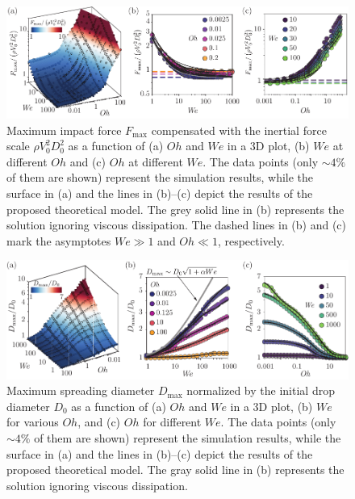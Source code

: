 \documentclass[preprint,amssymb,superscriptaddress,aps,prl,floatfix]{revtex4-1}
\begin{document}
\begin{figure}
\centering
\includegraphics[width=\linewidth]{Figure2_v4-eps-converted-to.pdf}
\caption{Maximum impact force $F_{\text{max}}$ compensated with the inertial force scale $\rho V_0^2D_0^2$ as a function of (a) $Oh$ and $We$ in a 3D plot, (b) $We$ at different $Oh$ and (c) $Oh$ at different $We$.  The data points (only $\sim 4\%$ of them are shown) represent the simulation results, while the surface in (a) and the lines in (b)--(c) depict the results of the proposed theoretical model. The grey solid line in (b) represents the solution ignoring viscous dissipation. The dashed lines in (b) and (c) mark the asymptotes $We \gg 1$ and $Oh \ll 1$, respectively.}
\label{fig:2}
\end{figure}


\begin{figure}
	\centering
	\includegraphics[width=\linewidth]{Figure3_v6-eps-converted-to.pdf}
	\caption{
 Maximum spreading diameter $D_{\text{max}}$ normalized by the initial drop diameter $D_0$ as a function of (a) $Oh$ and $We$ in a 3D plot, (b) $We$ for various $Oh$, and (c) $Oh$ for different $We$. The data points (only $\sim 4\%$ of them are shown)
 represent the simulation results, while the surface in (a) and the lines in (b)--(c) depict the results of the proposed theoretical model. The gray solid line in (b) represents the solution ignoring viscous dissipation.}
	\label{fig:3}
\end{figure}
\end{document}
